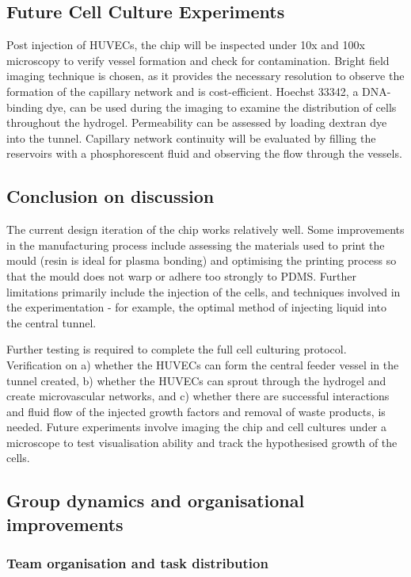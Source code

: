 \documentclass[letterpaper,12pt]{article}
\begin{document}
\subsection{Future Cell Culture Experiments}

Post injection of HUVECs, the chip will be inspected under 10x and 100x microscopy to verify vessel formation and check for contamination. Bright field imaging technique is chosen, as it provides the necessary resolution to observe the formation of the capillary network and is cost-efficient. Hoechst 33342, a DNA-binding dye, can be used during the imaging to examine the distribution of cells throughout the hydrogel. Permeability can be assessed by loading dextran dye into the tunnel. Capillary network continuity will be evaluated by filling the reservoirs with a phosphorescent fluid and observing the flow through the vessels. 



\subsection{Conclusion on discussion}
The current design iteration of the chip works relatively well. Some improvements in the manufacturing process include assessing the materials used to print the mould (resin is ideal for plasma bonding) and optimising the printing process so that the mould does not warp or adhere too strongly to PDMS. Further limitations primarily include the injection of the cells, and techniques involved in the experimentation - for example, the optimal method of injecting liquid into the central tunnel. 

Further testing is required to complete the full cell culturing protocol. Verification on a) whether the HUVECs can form the central feeder vessel in the tunnel created, b) whether the HUVECs can sprout through the hydrogel and create microvascular networks, and c) whether there are successful interactions and fluid flow of the injected growth factors and removal of waste products, is needed. Future experiments involve imaging the chip and cell cultures under a microscope to test visualisation ability and track the hypothesised growth of the cells. 


\subsection{Group dynamics and organisational improvements}
\subsubsection{Team organisation and task distribution}
\end{document}
